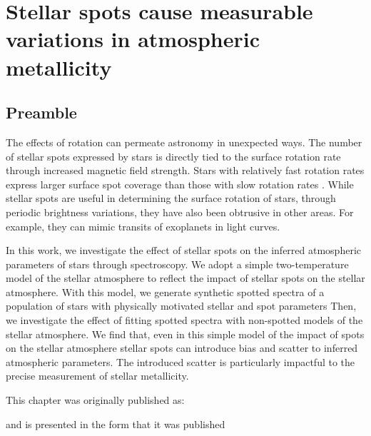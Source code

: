 
\chapter{Stellar spots cause measurable variations in atmospheric metallicity}
\label{chap:stellar_spots}

\section*{Preamble}

The effects of rotation can permeate astronomy in unexpected ways.
The number of stellar spots expressed by stars is directly tied to the surface rotation rate through increased magnetic field strength.
Stars with relatively fast rotation rates express larger surface spot coverage than those with slow rotation rates \citep{cao_starspots_2022}.
While stellar spots are useful in determining the surface rotation of stars, through periodic brightness variations, they have also been obtrusive in other areas.
For example, they can mimic transits of exoplanets in light curves.

In this work, we investigate the effect of stellar spots on the inferred atmospheric parameters of stars through spectroscopy.
We adopt a simple two-temperature model of the stellar atmosphere to reflect the impact of stellar spots on the stellar atmosphere.
With this model, we generate synthetic spotted spectra of a population of stars with physically motivated stellar and spot parameters
Then, we investigate the effect of fitting spotted spectra with non-spotted models of the stellar atmosphere.
We find that, even in this simple model of the impact of spots on the stellar atmosphere stellar spots can introduce bias and scatter to inferred atmospheric parameters.
The introduced scatter is particularly impactful to the precise measurement of stellar metallicity.


This chapter was originally published as:
\begin{quote}
	\citet{tanner_ss}
\end{quote}
and is presented in the form that it was published 



\newpage




